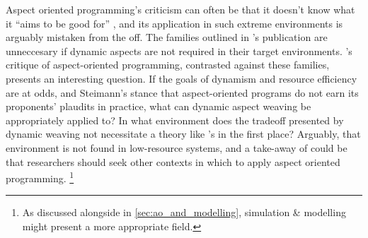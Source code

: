 Aspect oriented programming's criticism can often be that it doesn't know what
it ``aims to be good for'' , and its application in such extreme environments is
arguably mistaken from the off. The families outlined in
\citeauthor{gilani2004family}'s publication are unneccesary if dynamic aspects
are not required in their target environments.
's critique of aspect-oriented programming,
contrasted against these families, presents an interesting question. If the
goals of dynamism and resource efficiency are at odds, and Steimann's stance
that aspect-oriented programs do not earn its proponents' plaudits in practice,
what can dynamic aspect weaving be appropriately applied to? In what environment
does the tradeoff presented by dynamic weaving not necessitate a theory like
\citeauthor{gilani2004family}'s in the first place? Arguably, that environment
is not found in low-resource systems, and a take-away of \cite{gilani2004family}
could be that researchers should seek other contexts in which to apply aspect
oriented programming. \footnote{As discussed alongside \cite{gulyas1999use} in
\cref{sec:ao_and_modelling}, simulation \& modelling might present a more
appropriate field.}









